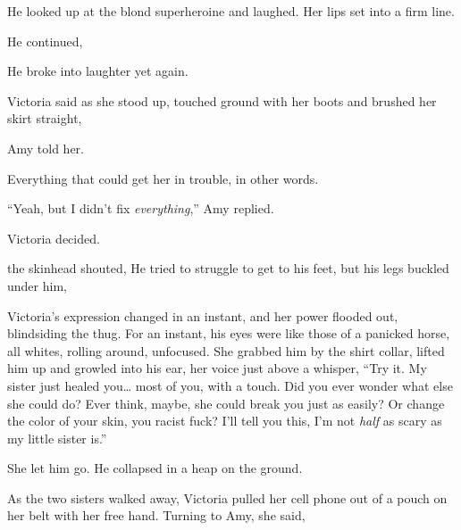 He looked up at the blond superheroine and laughed. Her lips set into a firm line.

He continued, 

He broke into laughter yet again.

 Victoria said as she stood up, touched ground with her boots and brushed her skirt straight, 

 Amy told her.

 Everything that could get her in trouble, in other words.

“Yeah, but I didn't fix {\em everything},” Amy replied.

 Victoria decided.

 the skinhead shouted,  He tried to struggle to get to his feet, but his legs buckled under him, 

Victoria's expression changed in an instant, and her power flooded out, blindsiding the thug. For an instant, his eyes were like those of a panicked horse, all whites, rolling around, unfocused. She grabbed him by the shirt collar, lifted him up and growled into his ear, her voice just above a whisper, “Try it. My sister just healed you\ldots{} most of you, with a touch. Did you ever wonder what else she could do? Ever think, maybe, she could break you just as easily? Or change the color of your skin, you racist fuck? I'll tell you this, I'm not {\em half} as scary as my little sister is.”

She let him go. He collapsed in a heap on the ground.

As the two sisters walked away, Victoria pulled her cell phone out of a pouch on her belt with her free hand. Turning to Amy, she said, 


